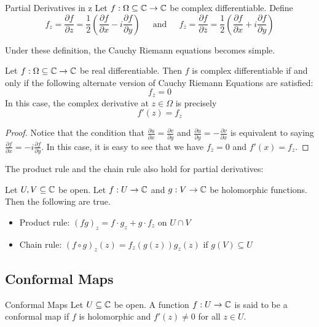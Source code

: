 \documentclass[a4paper]{article}
\begin{document}
\begin{defn}{Partial Derivatives in z}{} Let $f:\Omega\subseteq\mathbb{C}\to\mathbb{C}$ be complex differentiable. Define $$f_z=\frac{\partial f}{\partial z}=\frac{1}{2}\left(\frac{\partial f}{\partial x}-i\frac{\partial f}{\partial y}\right)\;\;\;\;\text{ and }\;\;\;\;f_{\overline{z}}=\frac{\partial f}{\partial \overline{z}}=\frac{1}{2}\left(\frac{\partial f}{\partial x}+i\frac{\partial f}{\partial y}\right)$$
\end{defn}

Under these definition, the Cauchy Riemann equations becomes simple. 

\begin{lmm}{}{} Let $f:\Omega\subseteq\mathbb{C}\to\mathbb{C}$ be real differentiable. Then $f$ is complex differentiable if and only if the following alternate version of Cauchy Riemann Equations are satisfied: $$f_{\overline{z}}=0$$ In this case, the complex derivative at $z\in\Omega$ is precisely $$f'(z)=f_z$$ \tcbline
\begin{proof}
Notice that the condition that $\frac{\partial u}{\partial x}=\frac{\partial v}{\partial y}$ and $\frac{\partial u}{\partial y}=-\frac{\partial v}{\partial x}$ is equivalent to saying $\frac{\partial f}{\partial x}=-i\frac{\partial f}{\partial y}$. In this case, it is easy to see that we have $f_{\overline{z}}=0$ and $f'(x)=f_z$. 
\end{proof}
\end{lmm}

The product rule and the chain rule also hold for partial derivatives: 

\begin{lmm}{}{} Let $U,V\subseteq\mathbb{C}$ be open. Let $f:U\to\mathbb{C}$ and $g:V\to\mathbb{C}$ be holomorphic functions. Then the following are true. 
\begin{itemize}
\item Product rule: $(fg)_z=f\cdot g_z+g\cdot f_z$ on $U\cap V$
\item Chain rule: $(f\circ g)_z(z)=f_z(g(z))g_z(z)$ if $g(V)\subseteq U$
\end{itemize}
\end{lmm}

\subsection{Conformal Maps}
\begin{defn}{Conformal Maps}{} Let $U\subseteq\mathbb{C}$ be open. A function $f:U\to\mathbb{C}$ is said to be a conformal map if $f$ is holomorphic and $f'(z)\neq 0$ for all $z\in U$. 
\end{defn}
\end{document}
